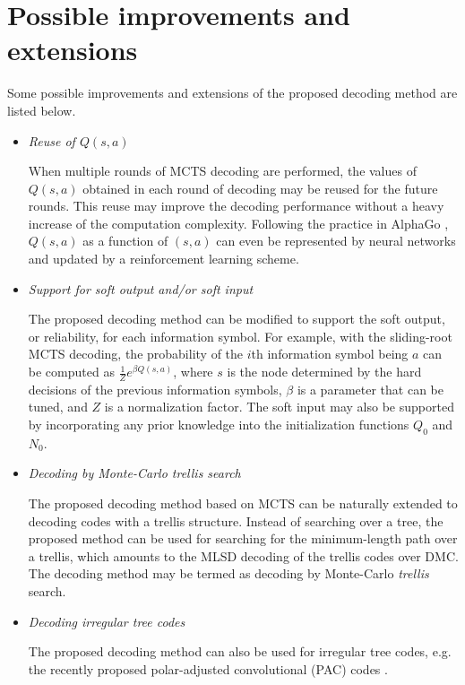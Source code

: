 \documentclass[conference,letterpaper]{IEEEtran}
\begin{document}
\section{Possible improvements and extensions}
Some possible improvements and extensions of the proposed decoding method are listed below.
\begin{itemize}[leftmargin=*]%
	\item
	\emph{Reuse of $Q(s,a)$}
	
	When multiple rounds of MCTS decoding are performed, the values of $Q(s,a)$ obtained in each round of decoding may be reused for the future rounds.
	This reuse may improve the decoding performance without a heavy increase of the computation complexity.	
	Following the practice in AlphaGo \cite{AlphaGo,AlphaGoZero}, $Q(s,a)$ as a function of $(s,a)$ can even be represented by neural networks and updated by a reinforcement learning scheme.

	\item
	\emph{Support for soft output and/or soft input}
	
	The proposed decoding method can be modified to support the soft output, or reliability, for each information symbol.
	For example, with the sliding-root MCTS decoding, the probability of the $i$th information symbol being $a$ can be computed as $\frac{1}{Z}e^{\beta Q(s,a)}$, where $s$ is the node determined by the hard decisions of the previous information symbols, $\beta$ is a parameter that can be tuned, and $Z$ is a normalization factor.
	The soft input may also be supported by incorporating any prior knowledge into the initialization functions $Q_0$ and $N_0$.
	

	\item
	\emph{Decoding by Monte-Carlo trellis search}
	
	The proposed decoding method based on MCTS can be naturally extended to decoding codes with a trellis structure. Instead of searching over a tree, the proposed method can be used for searching for the minimum-length path over a trellis, which amounts to the MLSD decoding of the trellis codes over DMC. The decoding method may be termed as decoding by Monte-Carlo \emph{trellis} search.
	
	
	\smallskip
	\item
	\emph{Decoding irregular tree codes}
	
	The proposed decoding method can also be used for irregular tree codes, e.g. the recently proposed polar-adjusted convolutional (PAC) codes \cite{pac_code}.
\end{itemize}
\end{document}
